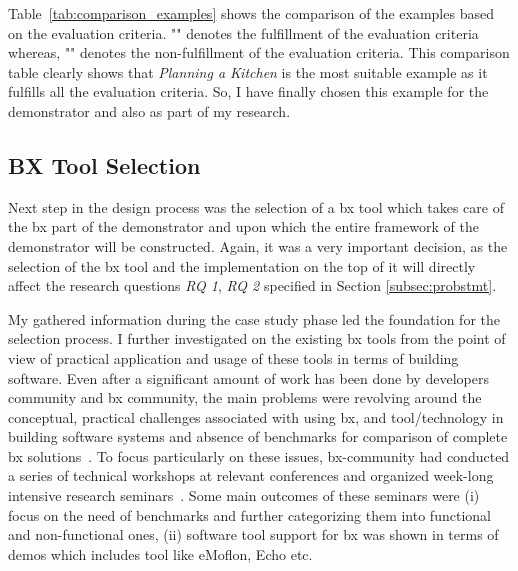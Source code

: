 Table~\ref{tab:comparison_examples} shows the comparison of the examples based on the evaluation criteria. "\checkmark" denotes the fulfillment of the evaluation criteria whereas, "" denotes the non-fulfillment of the evaluation criteria. This comparison table clearly shows that \textit{Planning a Kitchen} is the most suitable example as it fulfills all the evaluation criteria. So, I have finally chosen this example for the demonstrator and also as part of my research.

\subsection{BX Tool Selection}\label{subsec:bxtoolselection}
Next step in the design process was the selection of a bx tool which takes care of the bx part of the demonstrator and upon which the entire framework of the demonstrator will be constructed. Again, it was a very important decision, as the selection of the bx tool and the implementation on the top of it will directly affect the research questions \textit{RQ 1}, \textit{RQ 2}  specified in Section \ref{subsec:probstmt}.

My gathered information during the case study phase led the foundation for the selection process. I further investigated on the existing bx tools from the point of view of practical application and usage of these tools in terms of building software. Even after a significant amount of work has been done by developers community and bx community, the main problems were revolving around the conceptual, practical challenges associated with using bx, and tool/technology in building software systems and absence of benchmarks for comparison of complete bx solutions~\cite{bx-theoryandappl}.
To focus particularly on these issues, bx-community had conducted a series of technical workshops at relevant conferences and organized week-long intensive research seminars~\cite{bx-theoryandappl}. Some main outcomes of these seminars were (i) focus on the need of benchmarks and further categorizing them into functional and non-functional ones, (ii) software tool support for bx was shown in terms of demos which includes tool like eMoflon, Echo etc.

